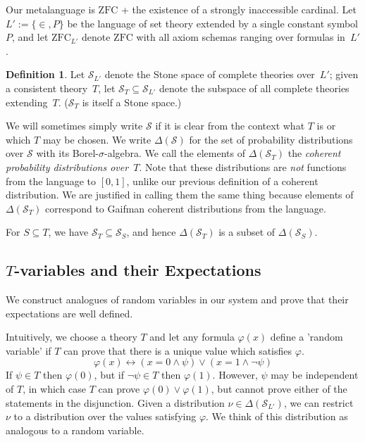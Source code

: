 \documentclass[12pt]{article}
\newcommand{\vp}{\varphi}
\newcommand{\zfc}{\mathrm{ZFC}}
\newcommand{\zfcl}{{\zfc_{\cL}}}
\newcommand{\cSL}{{\cS_{\cL}}}
\newcommand{\cL}{L'}
\newcommand{\cS}{\mathcal{S}}
\newcommand{\Tvar}{$T$-variable}
\theoremstyle{plain}
\theoremstyle{definition}
\newtheorem{definition}[theorem]{Definition}
\theoremstyle{remark}
\begin{document}
Our metalanguage is $\zfc$ + the existence of a strongly inaccessible cardinal.
Let $\cL := \{\in,P\}$ be the language of set theory extended by a single constant symbol $P$, and let $\zfcl$ denote $\zfc$ with all axiom schemas ranging over formulas in~$\cL$.
\begin{definition}
Let $\cSL$ denote the Stone space of complete theories over~$\cL$; given a consistent theory~$T$, let $\cS_T\subseteq\cSL$ denote the subspace of all complete theories extending~$T$. ($\cS_T$ is itself a Stone space.) 

We will sometimes simply write $\cS$ if it is clear from the context what $T$ is or which $T$ may be chosen.
We write $\Delta(\cS)$ for the set of probability distributions over $\cS$ with its Borel-$\sigma$-algebra.
We call the elements of $\Delta(\cS_T)$ the \emph{coherent probability distributions over~$T$}. 
Note that these distributions are \emph{not} functions from the language to $[0,1]$, unlike our previous definition of a coherent distribution. 
We are justified in calling them the same thing because elements of $\Delta(\cS_T)$ correspond to Gaifman coherent distributions from the language.
\end{definition}
For $S\subseteq T$, we have $\cS_T\subseteq\cS_S$, and hence $\Delta(\cS_T)$ is a subset of $\Delta(\cS_S)$.
\subsection{\Tvar{}s and their Expectations}
We construct analogues of random variables in our system and prove that their expectations are well defined.

Intuitively, we choose a theory $T$ and let any formula $\vp(x)$ define a 'random variable' if $T$ can prove that there is a unique value which satisfies $\vp$.
$$\vp(x) \leftrightarrow (x = 0 \wedge \psi) \vee (x = 1 \wedge \neg \psi)$$
If $\psi\in T$ then $\vp(0)$, but if $\neg \psi\in T$ then $\vp(1)$. 
However, $\psi$ may be independent of $T$, in which case $T$ can prove $\vp(0)\vee\vp(1)$, but cannot prove either of the statements in the disjunction.
Given a distribution $\nu\in \Delta(\cSL)$, we can restrict $\nu$ to a distribution over the values satisfying $\vp$.
We think of this distribution as analogous to a random variable.
\end{document}
